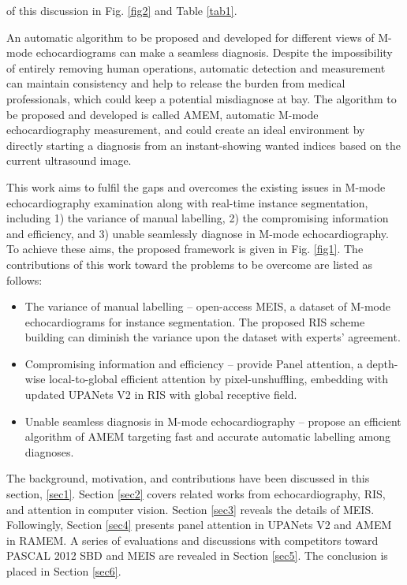 \documentclass{article}
\begin{document}
of this discussion in Fig. \ref{fig2} and Table \ref{tab1}.

An automatic algorithm to be proposed and developed for different views of M-mode echocardiograms can make a seamless diagnosis. Despite the impossibility of entirely removing human operations, automatic detection and measurement can maintain consistency and help to release the burden from medical professionals, which could keep a potential misdiagnose at bay. The algorithm to be proposed and developed is called AMEM, automatic M-mode echocardiography measurement, and could create an ideal environment by directly starting a diagnosis from an instant-showing wanted indices based on the current ultrasound image.

This work aims to fulfil the gaps and overcomes the existing issues in M-mode echocardiography examination along with real-time instance segmentation, including 1) the variance of manual labelling, 2) the compromising information and efficiency, and 3) unable seamlessly diagnose in M-mode echocardiography. To achieve these aims, the proposed framework is given in Fig. \ref{fig1}. The contributions of this work toward the problems to be overcome are listed as follows: 
\begin{itemize}
\item The variance of manual labelling – open-access MEIS, a dataset of M-mode echocardiograms for instance segmentation. The proposed RIS scheme building can diminish the variance upon the dataset with experts’ agreement.
\item Compromising information and efficiency – provide Panel attention, a depth-wise local-to-global efficient attention by pixel-unshuffling, embedding with updated UPANets V2 in RIS with global receptive field.
\item Unable seamless diagnosis in M-mode echocardiography – propose an efficient algorithm of AMEM targeting fast and accurate automatic labelling among diagnoses.
\end{itemize}

The background, motivation, and contributions have been discussed in this section, \ref{sec1}. Section \ref{sec2} covers related works from echocardiography, RIS, and attention in computer vision. Section \ref{sec3} reveals the details of MEIS. Followingly, Section \ref{sec4} presents panel attention in UPANets V2 and AMEM in RAMEM. A series of evaluations and discussions with competitors toward PASCAL 2012 SBD and MEIS are revealed in Section \ref{sec5}. The conclusion is placed in Section \ref{sec6}.
\end{document}
